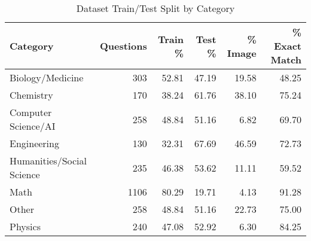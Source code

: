 \vspace*{-\baselineskip}
\vspace*{-\baselineskip}
\begin{table}[H]
\centering
\begin{tabular}{lrrrrr}
\toprule
Category & Questions & Train \% & Test \% & \% Image & \% Exact Match \\
\midrule
Biology/Medicine & 303 & 52.81 & 47.19 & 19.58 & 48.25 \\
Chemistry & 170 & 38.24 & 61.76 & 38.10 & 75.24 \\
Computer Science/AI & 258 & 48.84 & 51.16 & 6.82 & 69.70 \\
Engineering & 130 & 32.31 & 67.69 & 46.59 & 72.73 \\
Humanities/Social Science & 235 & 46.38 & 53.62 & 11.11 & 59.52 \\
Math & 1106 & 80.29 & 19.71 & 4.13 & 91.28 \\
Other & 258 & 48.84 & 51.16 & 22.73 & 75.00 \\
Physics & 240 & 47.08 & 52.92 & 6.30 & 84.25 \\
\bottomrule
\end{tabular}
\vspace{0.2cm}
\caption{Dataset Train/Test Split by Category}
\label{tab:split_statistics}
\end{table}
\vspace*{-\baselineskip}